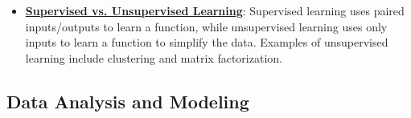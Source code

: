 \documentclass{article}%
\begin{document}
\begin{itemize}[leftmargin=*]
\item \href{https://purdue.brightspace.com/d2l/common/assets/pdfjs-d2l-dist/1.0.14-legacy/web/viewer.html?file=\%2Fcontent\%2Fenforced\%2F1095467-wl.202510.CS.24300.001\%2F12L2-distance-clusters.pdf\%3Fou\%3D1095467\&lang=en-us\&container=d2l-fileviewer-rendered-pdf\&fullscreen=d2l-fileviewer-rendered-pdf-dialog\&height=667#page=3}{\textbf{Supervised vs. Unsupervised Learning}}: Supervised learning uses paired inputs/outputs to learn a function, while unsupervised learning uses only inputs to learn a function to simplify the data. Examples of unsupervised learning include clustering and matrix factorization.%
\end{itemize}

%
\subsection{Data Analysis and Modeling}%
\label{subsec:DataAnalysisandModeling}%
\end{document}

